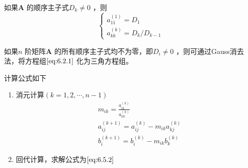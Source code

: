 \documentclass[a4paper]{article}
\begin{document}
如果$\mathbf{A}$ 的顺序主子式$D_k \neq 0$ ，则
\[
\begin{cases}
	a_{11}^{(1)} = D_1 \\
	a_{kk}^{(k)} = D_k / D_{k-1}
\end{cases} 
\] 

\begin{theorem}
	如果$n$ 阶矩阵$\mathbf{A}$ 的所有顺序主子式均不为零，即$D_i \neq 0$ ，则可通过Gauss消去法，将方程组$\ref{eq:6.2.1}$ 化为三角方程组。
\end{theorem}
计算公式如下
\begin{enumerate}
	\item 消元计算$(k=1,2,\cdots,n-1)$ 
		\[
		\begin{align*}
			& m_{ik} = \frac{a_{ik}^{(k)}}{a_{kk}^{(k)}} \\
			& a_{ij}^{(k+1)} = a_{ij}^{(k)} - m_{ik} a_{kj}^{(k)} \\
			& b_i^{(k+1)} = b_i^{(k)} - m_{ik} b_k^{(k)}
		\end{align*}
		\] 
	\item 回代计算，求解公式为$\ref{eq:6.5.2}$
\end{enumerate}
\end{document}
